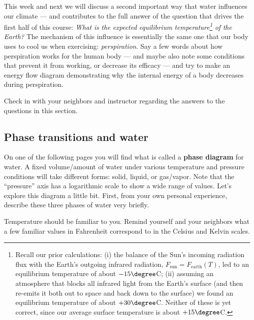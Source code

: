 \answerspace

\noindent This week and next we will discuss a second important way that water influences our climate --- and contributes to the full answer of the question that drives the first half of this course: {\em What is the expected equilibrium temperature\footnote{Recall our prior calculations: (i) the balance of the Sun's incoming radiation flux with the Earth's outgoing infrared radiation, $F_\text{sun} = F_\text{earth} (T)$, led to an equilibrium temperature of about $-15\degree$C; (ii) assuming an atmosphere that blocks all infrared light from the Earth's surface (and then re-emits it both out to space and back down to the surface) we found an equilibrium temperature of about $+30\degree$C. Neither of these is yet correct, since our average surface temperature is about $+15\degree$C.} of the Earth?}  The mechanism of this influence is essentially the same one that our body uses to cool us when exercising: {\em perspiration}.  Say a few words about how perspiration works for the human body --- and maybe also note some conditions that prevent it from working, or decrease its efficacy --- and try to make an energy flow diagram demonstrating why the internal energy of a body decreases during perspiration.

\answerspace[3cm]

\noindent Check in with your neighbors and instructor regarding the answers to the questions in this section.

\subsection{Phase transitions and water}

On one of the following pages you will find what is called a {\bf phase diagram} for water.  A fixed volume/amount of water under various temperature and pressure conditions will take different forms: solid, liquid, or gas/vapor.  Note that the ``pressure'' axis has a logarithmic scale to show a wide range of values.  Let's explore this diagram a little bit. First, from your own personal experience, describe these three phases of water very briefly.

\answerspace[2cm]

\noindent Temperature should be familiar to you. Remind yourself and your neighbors what a few familiar values in Fahrenheit correspond to in the Celsius and Kelvin scales.

\answerspace[2cm]

